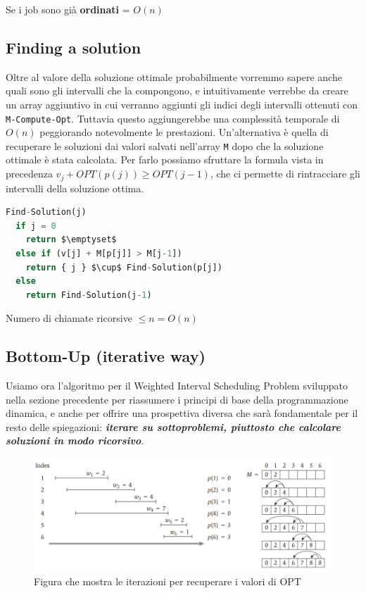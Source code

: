 Se i job sono già \textbf{ordinati} = $O(n)$


\subsection{Finding a solution}

Oltre al valore della soluzione ottimale probabilmente vorremmo sapere
anche quali sono gli intervalli che la compongono, e intuitivamente
verrebbe da creare un array aggiuntivo in cui verranno aggiunti gli
indici degli intervalli ottenuti con \texttt{M-Compute-Opt}. Tuttavia
questo aggiungerebbe una complessità temporale di $O(n)$ peggiorando
notevolmente le prestazioni. Un'alternativa è quella di recuperare le
soluzioni dai valori salvati nell'array \texttt{M} dopo che la soluzione
ottimale è stata calcolata. Per farlo possiamo sfruttare la formula
vista in precedenza $v_j + OPT(p(j)) \geq OPT(j-1)$, che ci permette
di rintracciare gli intervalli della soluzione ottima.

\begin{lstlisting}[language=Python, mathescape=true]
  Find-Solution(j)
  if j = 0
  	return $\emptyset$
  else if (v[j] + M[p[j]] > M[j-1])
  	return { j } $\cup$ Find-Solution(p[j]) 
  else
  	return Find-Solution(j-1)
\end{lstlisting}

Numero di chiamate ricorsive $\leq n = O(n)$

\subsection{Bottom-Up (iterative way)}

Usiamo ora l'algoritmo per il Weighted Interval Scheduling Problem
sviluppato nella sezione precedente per riassumere i principi di base
della programmazione dinamica, e anche per offrire una prospettiva
diversa che sarà fondamentale per il resto delle spiegazioni:
\textbf{\emph{iterare su sottoproblemi, piuttosto che calcolare
            soluzioni in modo ricorsivo}}.

\begin{figure}[H]
      \includegraphics[width = \textwidth]{capitoli/programmazione_dinamica/imgs/iter_comp_opt.png}
      \caption{Figura che mostra le iterazioni per recuperare i valori di OPT}
\end{figure}


